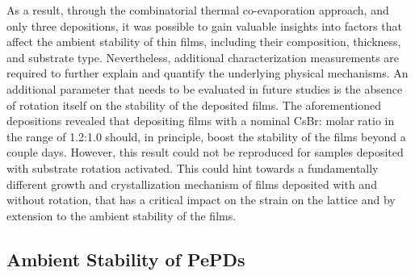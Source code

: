 As a result, through the combinatorial thermal co-evaporation approach, and only three depositions, it was possible to gain valuable insights into factors that affect the ambient stability of  thin films, including their composition, thickness, and substrate type. Nevertheless, additional characterization measurements are required to further explain and quantify the underlying physical mechanisms. An additional parameter that needs to be evaluated in future studies is the absence of rotation itself on the stability of the deposited films. The aforementioned depositions revealed that depositing films with a nominal CsBr: molar ratio in the range of 1.2:1.0 should, in principle, boost the stability of the films beyond a couple days. However, this result could not be reproduced for samples deposited with substrate rotation activated. This could hint towards a fundamentally different growth and crystallization mechanism of films deposited with and without rotation, that has a critical impact on the strain on the lattice and by extension to the ambient stability of the films. 


\subsection{Ambient Stability of PePDs}


